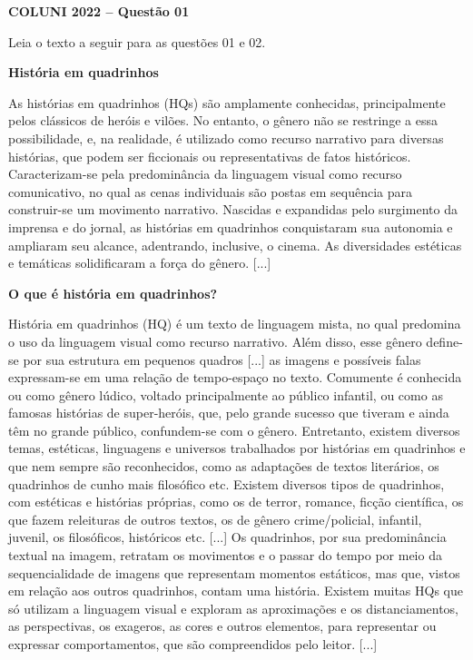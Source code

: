 \textbf{COLUNI 2022 -- Questão 01}\par\medskip Leia o texto a seguir para as questões 01 e 02.

\par

\begin{center}\textbf{História em quadrinhos}\end{center}

As histórias em quadrinhos (HQs) são amplamente conhecidas, principalmente pelos clássicos de heróis e vilões. No entanto, o gênero não se restringe a essa possibilidade, e, na realidade, é utilizado como recurso narrativo para diversas histórias, que podem ser ficcionais ou representativas de fatos históricos. Caracterizam-se pela predominância da linguagem visual como recurso comunicativo, no qual as cenas individuais são postas em sequência para construir-se um movimento narrativo. Nascidas e expandidas pelo surgimento da imprensa e do jornal, as histórias em quadrinhos conquistaram sua autonomia e ampliaram seu alcance, adentrando, inclusive, o cinema. As diversidades estéticas e temáticas solidificaram a força do gênero. [...]

\par

\textbf{O que é história em quadrinhos?}

História em quadrinhos (HQ) é um texto de linguagem mista, no qual predomina o uso da linguagem visual como recurso narrativo. Além disso, esse gênero define-se por sua estrutura em pequenos quadros [...] as imagens e possíveis falas expressam-se em uma relação de tempo-espaço no texto. Comumente é conhecida ou como gênero lúdico, voltado principalmente ao público infantil, ou como as famosas histórias de super-heróis, que, pelo grande sucesso que tiveram e ainda têm no grande público, confundem-se com o gênero. Entretanto, existem diversos temas, estéticas, linguagens e universos trabalhados por histórias em quadrinhos e que nem sempre são reconhecidos, como as adaptações de textos literários, os quadrinhos de cunho mais filosófico etc. Existem diversos tipos de quadrinhos, com estéticas e histórias próprias, como os de terror, romance, ficção científica, os que fazem releituras de outros textos, os de gênero crime/policial, infantil, juvenil, os filosóficos, históricos etc. [...] Os quadrinhos, por sua predominância textual na imagem, retratam os movimentos e o passar do tempo por meio da sequencialidade de imagens que representam momentos estáticos, mas que, vistos em relação aos outros quadrinhos, contam uma história. Existem muitas HQs que só utilizam a linguagem visual e exploram as aproximações e os distanciamentos, as perspectivas, os exageros, as cores e outros elementos, para representar ou expressar comportamentos, que são compreendidos pelo leitor. [...]

